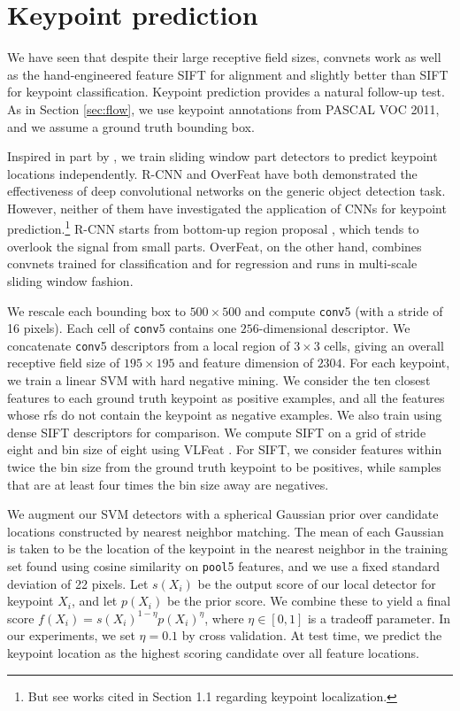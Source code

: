 \documentclass{article} \usepackage{nips14submit_e,times}
\begin{document}
\section{Keypoint prediction}
\label{sec:pred}

We have seen that 
despite their large receptive field sizes, convnets work as well as the hand-engineered
feature SIFT for alignment and slightly better than SIFT for
keypoint classification. Keypoint prediction provides a natural follow-up test.
As in Section \ref{sec:flow}, we use keypoint annotations from PASCAL VOC 2011,
and we assume a ground truth bounding box.



Inspired in part by \cite{RossJeff, overfeat, HumanPoseICLR}, we train sliding
window part detectors to predict keypoint locations independently.  R-CNN
\cite{RossJeff} and OverFeat \cite{overfeat} have both demonstrated the
effectiveness of deep convolutional networks on the generic object detection
task. However, neither of them have investigated the application of CNNs for
keypoint prediction.\footnote{But see works cited in Section 1.1 regarding
keypoint localization.} R-CNN starts from bottom-up region proposal
\cite{selsearch}, which tends to overlook the signal from small parts. OverFeat, on
the other hand, combines convnets trained for classification and
for regression and runs in multi-scale sliding window fashion.

We rescale each bounding box to $500 \times 500$ and compute \texttt{conv}5
(with a stride of 16 pixels).
Each cell of
\texttt{conv}5 contains one $256$-dimensional descriptor.
We concatenate \texttt{conv}5 descriptors from a local region of $3 \times 3$ 
cells, giving an overall receptive field size of $195 \times 195$ and feature
dimension of $2304$.
For each
keypoint, we train a linear SVM with hard negative mining.
We consider the ten closest features to each ground truth keypoint as positive
examples, and all the features whose rfs do not contain the keypoint as negative
examples.
We also train using dense SIFT descriptors for comparison.
We compute SIFT on a grid of stride eight
 and bin size of eight using VLFeat
\cite{vedaldi08vlfeat}.
For SIFT, we consider features within twice the bin
size from the ground truth keypoint to be positives,
while samples that are at least four times the bin size away are negatives.

We augment our SVM detectors with a spherical Gaussian prior over candidate locations
constructed by nearest neighbor matching.
The mean of each Gaussian is taken to be the location of the keypoint
in the nearest neighbor in the training set found using cosine similarity
on \texttt{pool}5 features, and we use a fixed standard deviation of 22 pixels.
Let $s(X_i)$ be the output score of our local detector for
keypoint $X_i$, and let $p(X_i)$ be the prior score.
We combine these to yield a final score $f(X_i) = s(X_i)^{1 - \eta}
p(X_i) ^ \eta$,
where $\eta \in [0,1]$ is a tradeoff parameter.
In our experiments, we set $\eta = 0.1$ by cross validation.
At test time, we predict the keypoint location as the highest scoring candidate
over all feature locations.
\end{document}
